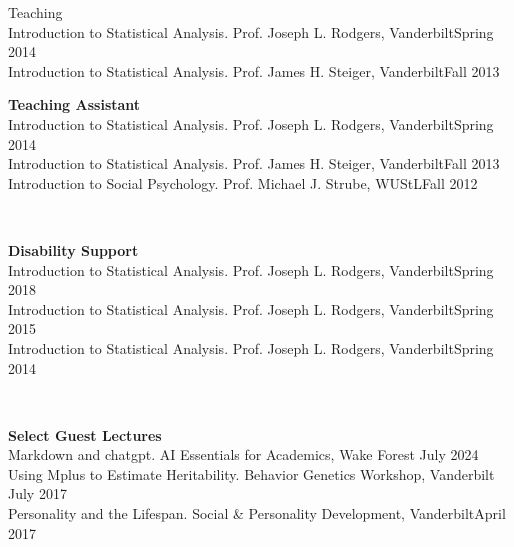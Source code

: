\begin{rSection}{\textrm{Teaching}}
\\
Introduction to Statistical Analysis. Prof. Joseph L. Rodgers, Vanderbilt\hfill{Spring 2014}\\
Introduction to Statistical Analysis. Prof. James H. Steiger, Vanderbilt\hfill{Fall 2013}%
\medskip\\
\begin{minipage}{\linewidth}{\large {\bf Teaching Assistant}}\\
Introduction to Statistical Analysis. Prof. Joseph L. Rodgers, Vanderbilt\hfill  {Spring 2014}\\
Introduction to Statistical Analysis. Prof. James H. Steiger, Vanderbilt\hfill  {Fall 2013}\\
Introduction to Social Psychology. Prof. Michael J. Strube, WUStL\hfill{Fall 2012}\end{minipage}\medskip\\
\begin{minipage}{\linewidth}{\large {\bf Disability Support}}\\
Introduction to Statistical Analysis. Prof. Joseph L. Rodgers, Vanderbilt\hfill  {Spring 2018}\\
Introduction to Statistical Analysis. Prof. Joseph L. Rodgers, Vanderbilt\hfill  {Spring 2015}\\
Introduction to Statistical Analysis. Prof. Joseph L. Rodgers, Vanderbilt\hfill{Spring 2014}\end{minipage}\medskip\\
\begin{minipage}{\linewidth}{\large {\bf Select Guest Lectures}}\\
Markdown and chatgpt. AI Essentials for Academics, Wake Forest \hfill{July 2024}\\
Using Mplus to Estimate Heritability. Behavior Genetics Workshop, Vanderbilt \hfill{July 2017}\\
Personality and the Lifespan. Social \& Personality Development, Vanderbilt\hfill {April 2017}\end{minipage}
\end{rSection}
